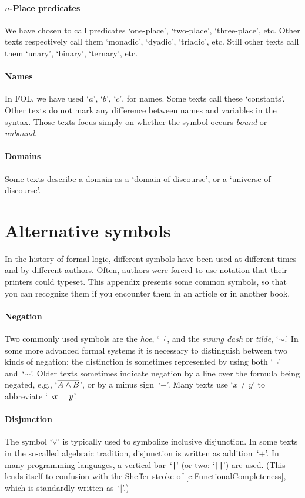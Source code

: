\paragraph{$n$-Place predicates} We have chosen to call predicates `one-place', `two-place', `three-place', etc. Other texts respectively call them `monadic', `dyadic', `triadic', etc. Still other texts call them `unary', `binary', `ternary', etc.

\paragraph{Names} In FOL, we have used `$a$', `$b$', `$c$', for names. Some texts call these `constants'. Other texts do not mark any difference between names and variables in the syntax. Those texts focus simply on  whether the symbol occurs \emph{bound} or \emph{unbound}.

\paragraph{Domains} Some texts describe a domain as a `domain of discourse', or a `universe of discourse'.

\section{Alternative symbols}
In the history of formal logic, different symbols have been used at different times and by different authors. Often, authors were forced to use notation that their printers could typeset. This appendix presents some common symbols, so that you can recognize them if you encounter them in an article or in another book.

\paragraph{Negation} Two commonly used symbols are the
\emph{hoe}, `$\neg$', and the \emph{swung dash} or \emph{tilde},
`${\sim}$.' In some more advanced formal systems it is necessary to
distinguish between two kinds of negation; the distinction is
sometimes represented by using both `$\neg$' and~`${\sim}$'. Older
texts sometimes indicate negation by a line over the formula being
negated, e.g., `$\overline{A \wedge B}$', or by a minus sign~`$-$'.
Many texts use `$x \neq y$' to abbreviate `$\neg x = y$'.

\paragraph{Disjunction} The symbol `$\vee$' is typically used to
symbolize inclusive disjunction. In some texts in the so-called algebraic
tradition, disjunction is written as addition~`$+$'. In many
programming languages, a vertical bar~`\verb+|+' (or two: `\verb+||+')
are used. (This lends itself to confusion with the Sheffer stroke of
\cref{c:FunctionalCompleteness}, which is standardly written
as~`$\mid$'.)

